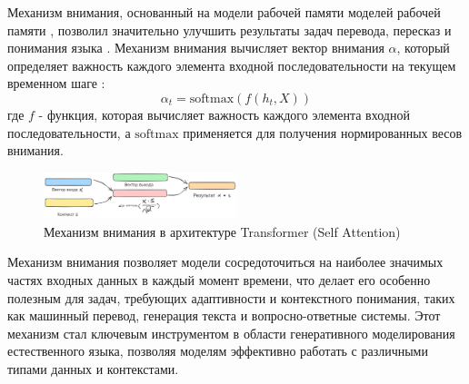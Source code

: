 Механизм внимания, основанный на модели рабочей памяти моделей рабочей памяти \cite{wallace1960plans},
позволил значительно улучшить результаты
задач перевода, пересказ и понимания языка \cite{bahdanau2014neural}.
Механизм внимания вычисляет вектор внимания \( \alpha \),
который определяет важность каждого элемента входной последовательности
на текущем временном шаге \cite{bahdanau2014neural}:
\begin{equation}
    \alpha_t = \text{softmax}(f(h_t, X))
\end{equation}
где \( f \) - функция, которая вычисляет важность каждого элемента входной последовательности, а \( \text{softmax} \) применяется для получения нормированных весов внимания.

\begin{figure}[h]
    \centering
    \includegraphics[width=0.5\textwidth]{assets/ml/nn/attention.excalidraw.png}
    \caption{Механизм внимания в архитектуре Transformer (Self Attention) \cite{vaswani2017attention} }
    \label{self_attention}
\end{figure}

Механизм внимания позволяет модели сосредоточиться на наиболее значимых частях входных данных в каждый момент времени, что делает его особенно полезным для задач, 
требующих адаптивности и контекстного понимания, таких как машинный перевод, генерация текста и вопросно-ответные системы. 
Этот механизм стал ключевым инструментом в области генеративного моделирования естественного языка, позволяя моделям эффективно работать с различными типами данных и контекстами.

